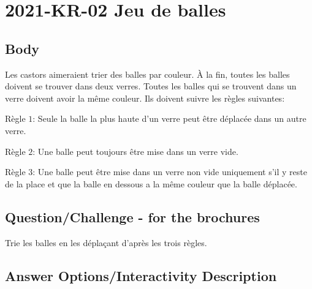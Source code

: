 \documentclass[a4paper,11pt]{report}
\newcommand{\taskGraphicsFolder}{..}
\begin{document}
\section*{\centering{} 2021-KR-02 Jeu de balles}


\subsection*{Body}

Les castors aimeraient trier des balles par couleur. À la fin, toutes les balles doivent se trouver dans deux verres. Toutes les balles qui se trouvent dans un verre doivent avoir la même couleur. Ils doivent suivre les règles suivantes:

\raisebox{\dimexpr -0.5ex -.3ex \relax}{} Règle $1$: Seule la balle la plus haute d’un verre peut être déplacée dans un autre verre.

\raisebox{\dimexpr -0.5ex -.3ex \relax}{} Règle $2$: Une balle peut toujours être mise dans un verre vide.

\raisebox{\dimexpr -0.5ex -.3ex \relax}{} Règle $3$: Une balle peut être mise dans un verre non vide uniquement s’il y reste de la place et que la balle en dessous a la même couleur que la balle déplacée.

{\centering%
\par}

{\em


\subsection*{Question/Challenge - for the brochures}

Trie les balles en les déplaçant d’après les trois règles.

{\centering%
\par}

}

\begingroup
\renewcommand{\arraystretch}{1.5}
\subsection*{Answer Options/Interactivity Description}
\end{document}
